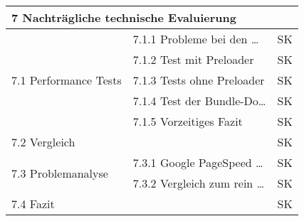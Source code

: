 \begin{longtable}{| l | l | c |}
\multicolumn{3}{|l|}{\textbf{
7 Nachträgliche technische Evaluierung}} \\ \hline
\multirow{5}{*}{7.1 Performance Tests}  
& 7.1.1 Probleme bei den \dots & SK \\
& 7.1.2 Test mit Preloader & SK \\ 
& 7.1.3 Tests ohne Preloader & SK \\
& 7.1.4 Test der Bundle-Do\dots & SK \\
& 7.1.5 Vorzeitiges Fazit & SK \\ \hline
\multicolumn{2}{|l|}{7.2 Vergleich} & SK \\ \hline
\multirow{2}{*}{7.3 Problemanalyse}  
& 7.3.1 Google PageSpeed \dots & SK \\
& 7.3.2 Vergleich zum rein \dots & SK \\ \hline
\multicolumn{2}{|l|}{7.4 Fazit} & SK \\ \hline
\end{longtable}

